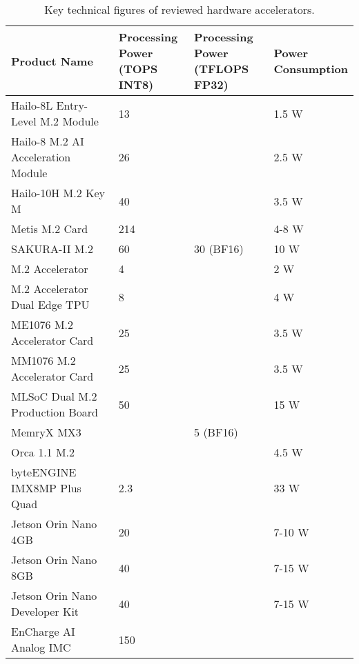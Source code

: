 \begin{table}[!ht]
    \centering
    \begin{tabular}{|l|l|l|l|}
    \hline
        Product Name & \makecell{Processing\\Power\\(TOPS INT8)} & \makecell{Processing\\Power\\(TFLOPS FP32)} & \makecell{Power\\Consumption} \\ \hline
        Hailo-8L Entry-Level M.2 Module & 13 & ~ & 1.5 W \\ \hline
        Hailo-8 M.2 AI Acceleration Module & 26 & ~ & 2.5 W \\ \hline
        Hailo-10H M.2 Key M & 40 & ~ & 3.5 W \\ \hline
        Metis M.2 Card & 214 & ~ & 4-8 W \\ \hline
        SAKURA-II M.2 & 60 & 30 (BF16) & 10 W \\ \hline
        M.2 Accelerator & 4 & ~ & 2 W \\ \hline
        M.2 Accelerator Dual Edge TPU & 8 & ~ & 4 W \\ \hline
        ME1076 M.2 Accelerator Card & 25 & ~ & 3.5 W \\ \hline
        MM1076 M.2 Accelerator Card & 25 & ~ & 3.5 W \\ \hline
        MLSoC Dual M.2 Production Board & 50 & ~ & 15 W \\ \hline
        MemryX MX3 & ~ & 5 (BF16) & ~ \\ \hline
        Orca 1.1 M.2 & ~ & ~ & 4.5 W \\ \hline
        byteENGINE IMX8MP Plus Quad & 2.3 & ~ & 33 W \\ \hline
        Jetson Orin Nano 4GB & 20 & ~ & 7-10 W \\ \hline
        Jetson Orin Nano 8GB & 40 & ~ & 7-15 W \\ \hline
        Jetson Orin Nano Developer Kit & 40 & ~ & 7-15 W \\ \hline
        EnCharge AI Analog IMC & 150  & ~ & ~ \\ \hline
    \end{tabular}
    \caption{Key technical figures of reviewed hardware accelerators.}
    \label{tab:market:keyfigures}
\end{table}
